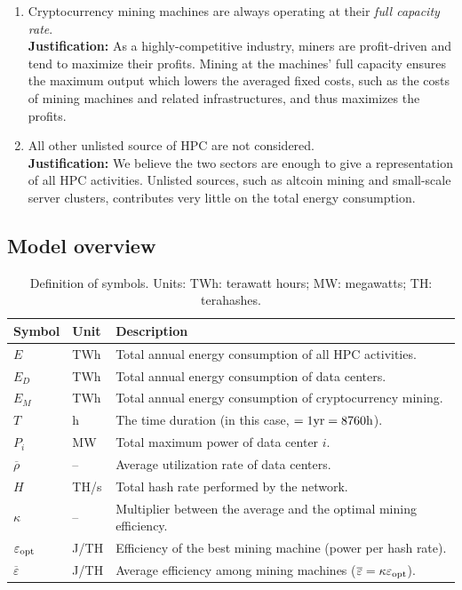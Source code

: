 \documentclass[12pt]{article}
\begin{document}
\begin{enumerate}
	\item Cryptocurrency mining machines are always operating at their \textit{full capacity rate}. \\
	\textbf{Justification:} As a highly-competitive industry, miners are profit-driven and tend to maximize their profits. Mining at the machines' full capacity ensures the maximum output which lowers the averaged fixed costs, such as the costs of mining machines and related infrastructures, and thus maximizes the profits.

	\item All other unlisted source of HPC are not considered. \\
	\textbf{Justification:} We believe the two sectors are enough to give a representation of all HPC activities. Unlisted sources, such as altcoin mining and small-scale server clusters, contributes very little on the total energy consumption.
\end{enumerate}

\subsection{Model overview}

\begin{table}[!t]
	\centering
	\caption{Definition of symbols. Units: TWh: terawatt hours; MW: megawatts; TH: terahashes.}
	\label{table_symbols_q1}
	\begin{tabular}{lll}
		\hline
		\textbf{Symbol} & \textbf{Unit} & \textbf{Description} \\
		\hline
		$E$ & TWh & Total annual energy consumption of all HPC activities. \\
		$E_D$ & TWh & Total annual energy consumption of data centers. \\
		$E_M$ & TWh & Total annual energy consumption of cryptocurrency mining. \\
		$T$ & h & The time duration (in this case, $\rm = 1yr = 8760h$). \\
		$P_i$ & MW & Total maximum power of data center $i$. \\
		$\overline{\rho}$ & -- & Average utilization rate of data centers. \\
		$H$ & TH/s & Total hash rate performed by the network. \\
		$\kappa$ & -- & Multiplier between the average and the optimal mining efficiency. \\
		$\varepsilon_{\rm opt}$ & J/TH & Efficiency of the best mining machine (power per hash rate). \\
		$\overline{\varepsilon}$ & J/TH & Average efficiency among mining machines ($\overline{\varepsilon} = \kappa \varepsilon_{\rm opt}$). \\
		\hline
	\end{tabular}
\end{table}
\end{document}
